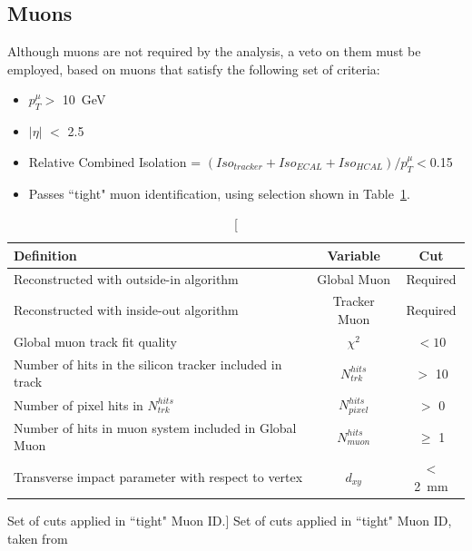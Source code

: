 \subsection{Muons}
Although muons are not required by the analysis, a veto on them must be employed, based on muons that satisfy the following set of criteria:
\begin{itemize}
\item $p^{\mu}_{T} >$ 10~GeV
\item $| \eta|$ $<$ 2.5
\item Relative Combined Isolation = $(Iso_{tracker} + Iso_{ECAL} + Iso_{HCAL}) / p^{\mu}_{T} < $0.15\footnotemark
\item Passes ``tight" muon identification, using selection shown in Table~\ref{tab:muid}.
\end{itemize}

\begin{table}[htbp]
\centering
\begin{tabular}{ m{8.9cm} c c }
\hline
\hline
 \centering Definition & Variable & Cut \\
\hline
\hline
 Reconstructed with outside-in algorithm & Global Muon & Required\\
Reconstructed with inside-out algorithm & Tracker Muon & Required\\
 Global muon track fit quality & $\chi^{2}$ & $< 10$ \\
Number of hits in the silicon tracker included in track & $N^{hits}_{\textit{trk}}$ &$ >$ 10\\
Number of pixel hits in $N^{hits}_{trk}$ & $N^{hits}_{\textit{pixel}}$ & $ > $ 0\\
Number of hits in muon system included in Global Muon & $N^{hits}_{\textit{muon}}$ & $\geq $ 1\\
Transverse impact parameter with respect to vertex & $d_{xy}$ & $< $ 2~mm\\
\hline
\end{tabular}
\caption[Set of cuts applied in ``tight" Muon ID.]{\label{tab:muid} Set of cuts applied in ``tight" Muon ID, taken from \cite{MUO-10-002}}
\end{table}



